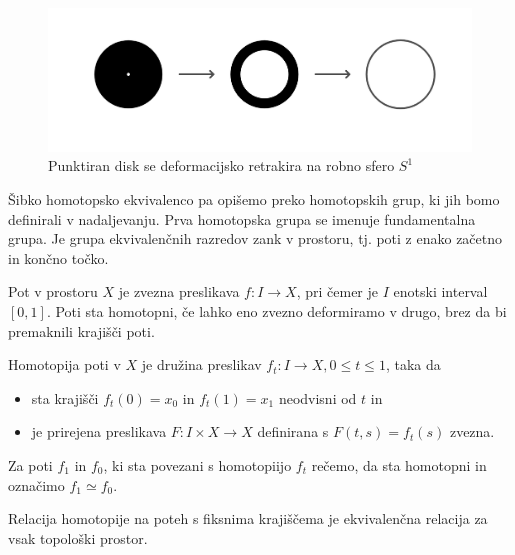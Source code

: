 \documentclass[mat1]{fmfdelo}
\begin{document}
\begin{figure}[h!]
    \centering
    \includegraphics[width=1\linewidth]{def-retract.png}
    \caption{Punktiran disk se deformacijsko retrakira na robno sfero $S^1$}
\end{figure}

Šibko homotopsko ekvivalenco pa opišemo preko homotopskih grup, ki
 jih bomo definirali v nadaljevanju. Prva homotopska grupa se imenuje
  fundamentalna grupa. Je grupa ekvivalenčnih razredov zank v prostoru, 
 tj. poti z enako začetno in končno točko.

Pot v prostoru $X$ je zvezna preslikava $ f: I \rightarrow X$, pri čemer je $I$ enotski interval $[0,1]$. Poti sta homotopni, če lahko eno zvezno deformiramo v drugo, brez da bi premaknili krajišči poti.
\begin{definicija}
    
    Homotopija poti v $X$ je družina preslikav $f_t:I \rightarrow X, 0\le t \le 1$, taka da
    \begin{itemize}
        \item 
        sta krajišči $f_t(0) = x_0$ in $f_t(1) = x_1$ neodvisni od $t$ in
        \item 
        je prirejena preslikava $F:I\times X \rightarrow X$ definirana s $F(t,s) = f_t(s)$ zvezna.
    \end{itemize}
    Za poti $f_1$ in $f_0$, ki sta povezani s homotopiijo $f_t$ rečemo, da sta homotopni in označimo $f_1 \simeq f_0$.
\end{definicija}



\begin{trditev}
    Relacija homotopije na poteh s fiksnima krajiščema je ekvivalenčna relacija za vsak topološki prostor.
\end{trditev}
\end{document}
